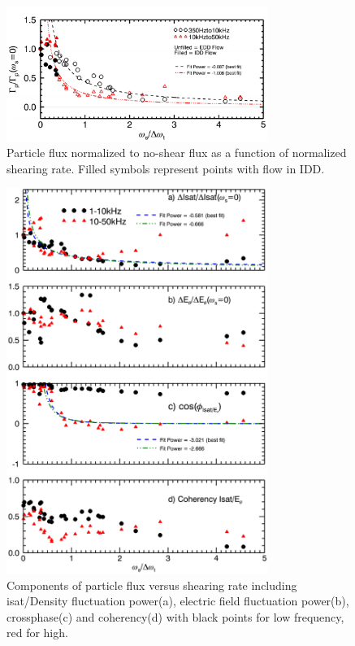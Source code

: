 \documentclass[%
 aps,
 prl,
 amsmath,amssymb,
 reprint,%
]{revtex4-1}
\begin{document}
\begin{figure}
\begin{center}
\includegraphics[width=8.5cm]{fluxvsshear.pdf}%
\caption{\label{fig:fluxvsshear} Particle flux normalized to no-shear flux as a function of normalized shearing rate. Filled symbols represent points with flow in IDD.}
\end{center}
\end{figure}


\begin{figure}
\begin{center}
\includegraphics[width=8.5cm]{fluxcomps.pdf}%
\caption{\label{fig:fluxcomps} Components of particle flux versus shearing rate including isat/Density fluctuation power(a), electric field fluctuation power(b), crossphase(c) and coherency(d) with black points for low frequency, red for high.}
\end{center}
\end{figure}
\end{document}
